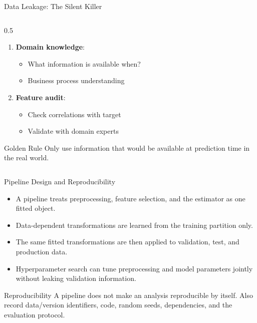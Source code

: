 \documentclass[aspectratio=169,11pt]{beamer}
\begin{document}
\begin{frame}{Data Leakage: The Silent Killer}
\begin{columns}
\begin{column}{0.5\textwidth}
\begin{enumerate}
\item \textbf{Domain knowledge}:
   \begin{itemize}
   \item What information is available when?
   \item Business process understanding
   \end{itemize}

\item \textbf{Feature audit}:
   \begin{itemize}
   \item Check correlations with target
   \item Validate with domain experts
   \end{itemize}
\end{enumerate}

\begin{alertblock}{Golden Rule}
Only use information that would be available at prediction time in the real world.
\end{alertblock}
\end{column}
\end{columns}
\end{frame}

\begin{frame}{Pipeline Design and Reproducibility}
\begin{itemize}
  \item A pipeline treats preprocessing, feature selection, and the estimator as one fitted object.
  \item Data-dependent transformations are learned from the training partition only.
  \item The same fitted transformations are then applied to validation, test, and production data.
  \item Hyperparameter search can tune preprocessing and model parameters jointly without leaking validation information.
\end{itemize}

\begin{alertblock}{Reproducibility}
A pipeline does not make an analysis reproducible by itself. Also record data/version identifiers, code, random seeds, dependencies, and the evaluation protocol.
\end{alertblock}
\end{frame}
\end{document}
